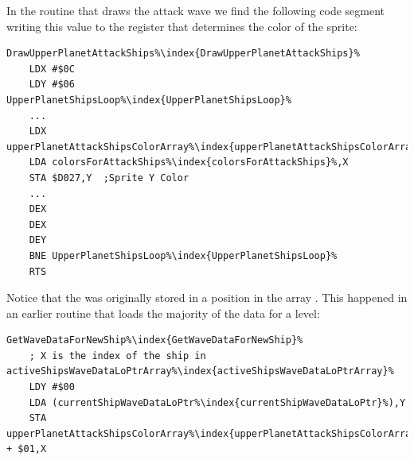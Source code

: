 In the routine that draws the attack wave we find the following code segment writing this value
to the register  that determines the color of the sprite:

\begin{lstlisting}[escapechar=\%]
DrawUpperPlanetAttackShips%\index{DrawUpperPlanetAttackShips}%
    LDX #$0C
    LDY #$06
UpperPlanetShipsLoop%\index{UpperPlanetShipsLoop}%   
    ...
    LDX upperPlanetAttackShipsColorArray%\index{upperPlanetAttackShipsColorArray}%,Y
    LDA colorsForAttackShips%\index{colorsForAttackShips}%,X
    STA $D027,Y  ;Sprite Y Color
    ...
    DEX
    DEX
    DEY
    BNE UpperPlanetShipsLoop%\index{UpperPlanetShipsLoop}%
    RTS
\end{lstlisting}

Notice that the  was originally stored in a position in the array .
This happened in an earlier routine that loads the majority of the data for a level:


\begin{lstlisting}[escapechar=\%]
GetWaveDataForNewShip%\index{GetWaveDataForNewShip}%
    ; X is the index of the ship in activeShipsWaveDataLoPtrArray%\index{activeShipsWaveDataLoPtrArray}%
    LDY #$00
    LDA (currentShipWaveDataLoPtr%\index{currentShipWaveDataLoPtr}%),Y
    STA upperPlanetAttackShipsColorArray%\index{upperPlanetAttackShipsColorArray}% + $01,X
\end{lstlisting}

